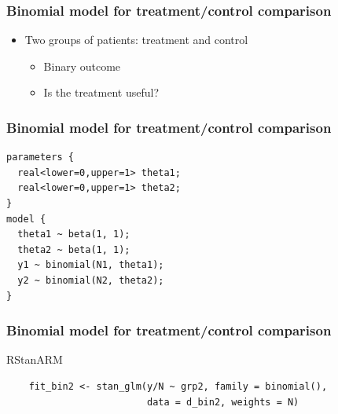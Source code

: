\documentclass[english,t]{beamer}
\begin{document}


\begin{frame}[fragile]
  \frametitle{Binomial model for treatment/control comparison}

  \begin{itemize}
  \item Two groups of patients: treatment and control
    \begin{itemize}
    \item Binary outcome
    \item Is the treatment useful?
    \end{itemize}
  \end{itemize}

\end{frame}
  
\begin{frame}[fragile]
  \frametitle{Binomial model for treatment/control comparison}
  {\footnotesize
  \begin{lstlisting}
parameters {
  real<lower=0,upper=1> theta1;
  real<lower=0,upper=1> theta2;
}
model {
  theta1 ~ beta(1, 1);
  theta2 ~ beta(1, 1);
  y1 ~ binomial(N1, theta1);
  y2 ~ binomial(N2, theta2);
}
  \end{lstlisting}
}
\end{frame} 

\begin{frame}[fragile]
  \frametitle{Binomial model for treatment/control comparison}

  RStanARM
  {\scriptsize
  \begin{lstlisting}
    fit_bin2 <- stan_glm(y/N ~ grp2, family = binomial(),
                         data = d_bin2, weights = N)
  \end{lstlisting}
}
\end{frame} 
\end{document}
